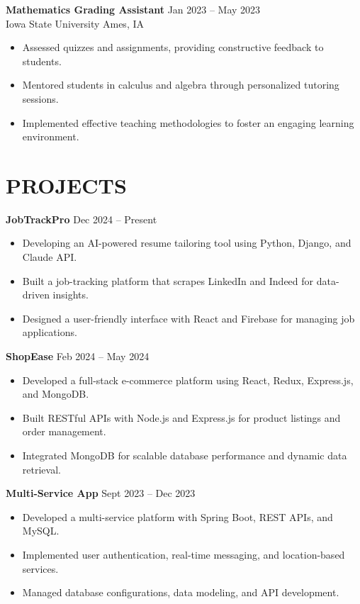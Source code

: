 \documentclass[letterpaper,11pt]{article}
\begin{document}
\begin{resume}
\textbf{Mathematics Grading Assistant} \hfill Jan 2023 – May 2023 \\
Iowa State University \hfill Ames, IA  
\begin{itemize}
  \item Assessed quizzes and assignments, providing constructive feedback to students.
  \item Mentored students in calculus and algebra through personalized tutoring sessions.
  \item Implemented effective teaching methodologies to foster an engaging learning environment.
\end{itemize}

\section{PROJECTS}
\textbf{JobTrackPro} \hfill Dec 2024 – Present
\begin{itemize}
  \item Developing an AI-powered resume tailoring tool using Python, Django, and Claude API.
  \item Built a job-tracking platform that scrapes LinkedIn and Indeed for data-driven insights.
  \item Designed a user-friendly interface with React and Firebase for managing job applications.
\end{itemize}

\textbf{ShopEase} \hfill Feb 2024 – May 2024
\begin{itemize}
  \item Developed a full-stack e-commerce platform using React, Redux, Express.js, and MongoDB.
  \item Built RESTful APIs with Node.js and Express.js for product listings and order management.
  \item Integrated MongoDB for scalable database performance and dynamic data retrieval.
\end{itemize}

\textbf{Multi-Service App} \hfill Sept 2023 – Dec 2023
\begin{itemize} 
  \item Developed a multi-service platform with Spring Boot, REST APIs, and MySQL.
  \item Implemented user authentication, real-time messaging, and location-based services.
  \item Managed database configurations, data modeling, and API development.
\end{itemize}

\end{resume}
\end{document}
